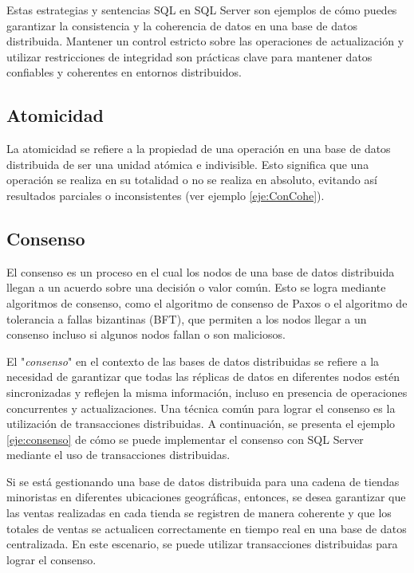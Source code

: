 Estas estrategias y sentencias SQL en SQL Server son ejemplos de cómo puedes garantizar la consistencia y la coherencia de datos en una base de datos distribuida. Mantener un control estricto sobre las operaciones de actualización y utilizar restricciones de integridad son prácticas clave para mantener datos confiables y coherentes en entornos distribuidos.

\subsection{Atomicidad}
\noindent
La atomicidad se refiere a la propiedad de una operación en una base de datos distribuida de ser una unidad atómica e indivisible. Esto significa que una operación se realiza en su totalidad o no se realiza en absoluto, evitando así resultados parciales o inconsistentes (ver ejemplo \ref{eje:ConCohe}).

\subsection{Consenso}
\noindent
El consenso es un proceso en el cual los nodos de una base de datos distribuida llegan a un acuerdo sobre una decisión o valor común. Esto se logra mediante algoritmos de consenso, como el algoritmo de consenso de Paxos o el algoritmo de tolerancia a fallas bizantinas (BFT), que permiten a los nodos llegar a un consenso incluso si algunos nodos fallan o son maliciosos.

El "\textit{consenso}" en el contexto de las bases de datos distribuidas se refiere a la necesidad de garantizar que todas las réplicas de datos en diferentes nodos estén sincronizadas y reflejen la misma información, incluso en presencia de operaciones concurrentes y actualizaciones. Una técnica común para lograr el consenso es la utilización de transacciones distribuidas. A continuación, se presenta el ejemplo \ref{eje:consenso} de cómo se puede implementar el consenso con SQL Server mediante el uso de transacciones distribuidas.

Si se está gestionando una base de datos distribuida para una cadena de tiendas minoristas en diferentes ubicaciones geográficas, entonces, se desea garantizar que las ventas realizadas en cada tienda se registren de manera coherente y que los totales de ventas se actualicen correctamente en tiempo real en una base de datos centralizada. En este escenario, se puede utilizar transacciones distribuidas para lograr el consenso.

